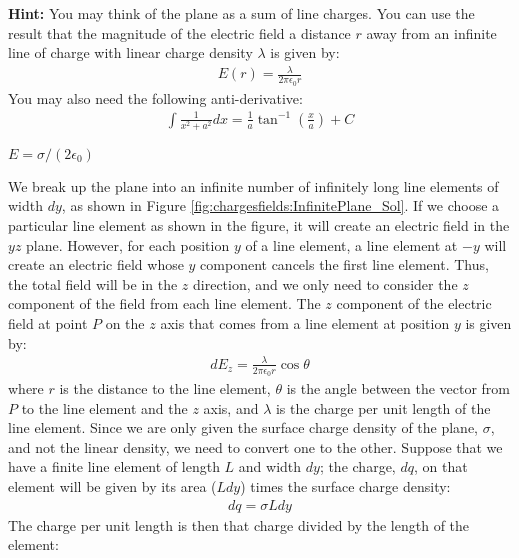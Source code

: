 \textbf{Hint:} You may think of the plane as a sum of line charges. You can use the result that the magnitude of the electric field a distance $r$ away from an infinite line of charge with linear charge density $\lambda$ is given by:
\begin{align*}
E(r) = \frac{\lambda}{2\pi\epsilon_0 r}
\end{align*}
You may also need the following anti-derivative:
\begin{align*}
\int \frac{1}{x^2+a^2}dx=\frac{1}{a}\tan^{-1}\left( \frac{x}{a}\right) + C
\end{align*}
\begin{finalanswer}
$E=\sigma/(2\epsilon_0)$
\end{finalanswer}
\begin{solution}
We break up the plane into an infinite number of infinitely long line elements of width $dy$, as shown in Figure \ref{fig:chargesfields:InfinitePlane_Sol}. If we choose a particular line element as shown in the figure, it will create an electric field in the $yz$ plane. However, for each position $y$ of a line element, a line element at $-y$ will create an electric field whose $y$ component cancels the first line element. Thus, the total field will be in the $z$ direction, and we only need to consider the $z$ component of the field from each line element.
The $z$ component of the electric field at point $P$ on the $z$ axis that comes from a line element at position $y$ is given by:
\begin{align*}
dE_z = \frac{\lambda}{2\pi\epsilon_0 r}\cos\theta
\end{align*}
where $r$ is the distance to the line element, $\theta$ is the angle between the vector from $P$ to the line element and the $z$ axis, and $\lambda$ is the charge per unit length of the line element. Since we are only given the surface charge density of the plane, $\sigma$, and not the linear density, we need to convert one to the other. Suppose that we have a finite line element of length $L$ and width $dy$; the charge, $dq$, on that element will be given by its area ($Ldy$) times the surface charge density:
\begin{align*}
dq = \sigma Ldy
\end{align*}
The charge per unit length is then that charge divided by the length of the element:
\begin{align*}

\end{align*}
\end{solution}
